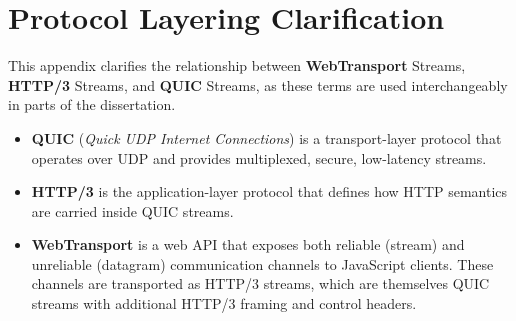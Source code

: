 \chapter{Protocol Layering Clarification}

This appendix clarifies the relationship between \textbf{WebTransport} Streams, \textbf{HTTP/3} Streams, and \textbf{QUIC} Streams, as these terms are used interchangeably in parts of the dissertation.

\begin{itemize}
  \item \textbf{QUIC} (\emph{Quick UDP Internet Connections}) is a transport-layer protocol that operates over UDP and provides multiplexed, secure, low-latency streams.
  \item \textbf{HTTP/3} is the application-layer protocol that defines how HTTP semantics are carried inside QUIC streams.
  \item \textbf{WebTransport} is a web API that exposes both reliable (stream) and unreliable (datagram) communication channels to JavaScript clients. These channels are transported as HTTP/3 streams, which are themselves QUIC streams with additional HTTP/3 framing and control headers.
\end{itemize}




